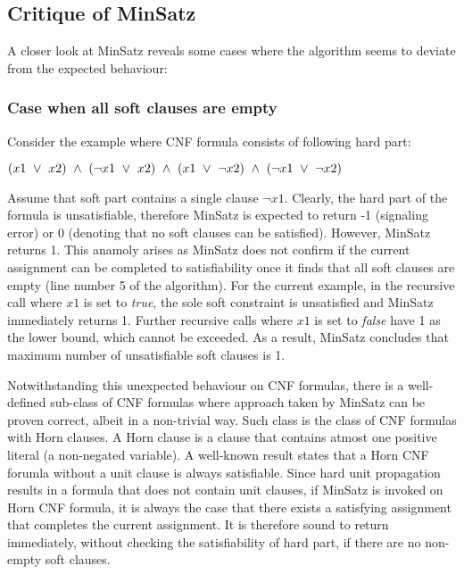 \subsection{Critique of MinSatz}
A closer look at MinSatz reveals some cases where the algorithm seems to deviate
from the expected behaviour:

\subsubsection{Case when all soft clauses are empty}
Consider the example where CNF formula consists of following hard part:
\begin{center}
  \(
    (x1 ~\vee~ x2) ~\wedge~ (\neg x1 ~\vee~ x2) ~\wedge~ (x1 ~\vee~ \neg x2) ~\wedge~
    (\neg x1 ~\vee~ \neg x2)
  \)
\end{center}
Assume that soft part contains a single clause $\neg x1$. Clearly, the hard part
of the formula is unsatisfiable, therefore MinSatz is expected to return -1
(signaling error) or 0 (denoting that no soft clauses can be satisfied).
However, MinSatz returns 1. This anamoly arises as MinSatz does not confirm if
the current assignment can be completed to satisfiability once it finds that all
soft clauses are empty (line number 5 of the algorithm). For the current
example, in the recursive call where $x1$ is set to \emph{true}, the sole soft
constraint is unsatisfied and MinSatz immediately returns 1. Further
recursive calls where $x1$ is set to \emph{false} have 1 as the lower bound,
which cannot be exceeded. As a result, MinSatz concludes that maximum number of
unsatisfiable soft clauses is 1. 

Notwithstanding this unexpected behaviour on CNF formulas, there is a
well-defined sub-class of CNF formulas where approach taken by MinSatz can be
proven correct, albeit in a non-trivial way. Such class is the class of CNF
formulas with Horn clauses. A Horn clause is a clause that contains atmost one
positive literal (a non-negated variable). A well-known result states that a Horn
CNF forumla without a unit clause is always satisfiable. Since hard unit
propagation results in a formula that does not contain unit clauses, if MinSatz
is invoked on Horn CNF formula, it is always the case that there exists a
satisfying assignment that completes the current assignment. It is therefore
sound to return immediately, without checking the satisfiability of hard part,
if there are no non-empty soft clauses.

